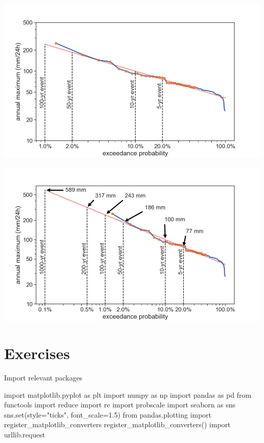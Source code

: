 \documentclass[
  letterpaper,
  DIV=11,
  numbers=noendperiod]{scrreprt}
\newenvironment{Shaded}{\begin{snugshade}}{\end{snugshade}}
\newcommand{\BuiltInTok}[1]{\textcolor[rgb]{0.00,0.23,0.31}{#1}}
\newcommand{\FloatTok}[1]{\textcolor[rgb]{0.68,0.00,0.00}{#1}}
\newcommand{\ImportTok}[1]{\textcolor[rgb]{0.00,0.46,0.62}{#1}}
\newcommand{\NormalTok}[1]{\textcolor[rgb]{0.00,0.23,0.31}{#1}}
\newcommand{\OperatorTok}[1]{\textcolor[rgb]{0.37,0.37,0.37}{#1}}
\newcommand{\StringTok}[1]{\textcolor[rgb]{0.13,0.47,0.30}{#1}}
\begin{document}
\includegraphics{archive/figures/extrapolation_exceedance3.png}

\includegraphics{archive/figures/extrapolation_exceedance4.png}

\hypertarget{exercises-3}{%
\chapter{Exercises}\label{exercises-3}}

Import relevant packages

\begin{Shaded}
\begin{Highlighting}[]
\ImportTok{import}\NormalTok{ matplotlib.pyplot }\ImportTok{as}\NormalTok{ plt}
\ImportTok{import}\NormalTok{ numpy }\ImportTok{as}\NormalTok{ np}
\ImportTok{import}\NormalTok{ pandas }\ImportTok{as}\NormalTok{ pd}
\ImportTok{from}\NormalTok{ functools }\ImportTok{import} \BuiltInTok{reduce}
\ImportTok{import}\NormalTok{ re}
\ImportTok{import}\NormalTok{ probscale}
\ImportTok{import}\NormalTok{ seaborn }\ImportTok{as}\NormalTok{ sns}
\NormalTok{sns.}\BuiltInTok{set}\NormalTok{(style}\OperatorTok{=}\StringTok{"ticks"}\NormalTok{, font\_scale}\OperatorTok{=}\FloatTok{1.5}\NormalTok{)}
\ImportTok{from}\NormalTok{ pandas.plotting }\ImportTok{import}\NormalTok{ register\_matplotlib\_converters}
\NormalTok{register\_matplotlib\_converters()}
\ImportTok{import}\NormalTok{ urllib.request}
\end{Highlighting}
\end{Shaded}
\end{document}
